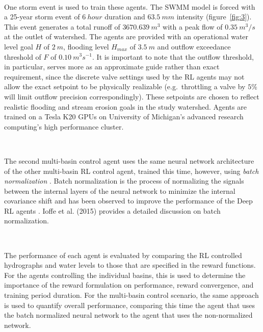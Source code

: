 \

One storm event is used to train these agents.
The SWMM model is forced with a 25-year storm event of $6\ hour$ duration and $63.5\ mm$ intensity (figure~\ref{fig:3}).
This event generates a total runoff of $3670.639\ m^3$ with a peak flow of $0.35\ m^3 /s$ at the outlet of watershed.
The agents are provided with an operational water level goal $H$ of $2\ m$, flooding level $H_{max}$ of $3.5\ m$ and outflow exceedance threshold of $F$ of $0.10\ m^3s^{-1}$.
It is important to note that the outflow threshold, in particular, serves more as an approximate guide rather than exact requirement, since the discrete valve settings used by the RL agents may not allow the exact setpoint to be physically realizable (e.g.\ throttling a valve by $5\%$ will limit outflow precision correspondingly).
These setpoints are chosen to reflect realistic flooding and stream erosion goals in the study watershed.
Agents are trained on a Tesla K20 GPUs on University of Michigan’s advanced research computing's high performance cluster.

\

The second multi-basin control agent uses the same neural network architecture of the other multi-basin RL control agent, trained this time, however, using \textit{batch normalization} \cite{ioffe2015batch}.
Batch normalization is the process of normalizing the signals between the internal layers of the neural network to minimize the internal covariance shift and has been observed to improve  the performance of the Deep RL agents \cite{Lillicrap2015ContinuousLearning}.
Ioffe et al. (2015) \cite{ioffe2015batch} provides a detailed discussion on batch normalization.

\

The performance of each agent is evaluated by comparing the RL controlled hydrographs and water levels to those that are specified in the reward functions.
For the agents controlling the individual basins, this is used to determine the importance of the reward formulation on performance, reward convergence, and training period duration.
For the multi-basin control scenario, the same approach is used to quantify overall performance, comparing this time the agent that uses the batch normalized neural network to the agent that uses the non-normalized network.

\

